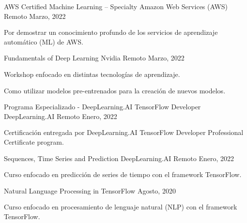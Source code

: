 

\begin{cventries}
  \cventry
  {AWS Certified Machine Learning – Specialty} %
  {Amazon Web Services (AWS)} %
  {Remoto} %
  {Marzo, 2022} %
  {
    \begin{cvitems} %
      \item {Por demostrar un conocimiento profundo de los servicios de aprendizaje automático (ML) de AWS.}
    \end{cvitems}
  } %
  \cventry
  {Fundamentals of Deep Learning} %
  {Nvidia} %
  {Remoto} %
  {Marzo, 2022} %
  {
    \begin{cvitems} %
      \item {Workshop enfocado en distintas tecnologías de aprendizaje.}
      \item {Como utilizar modelos pre-entrenados para la creación de nuevos modelos.}
    \end{cvitems}
  } %
  \cventry
  {Programa Especializado - DeepLearning.AI TensorFlow Developer} %
  {DeepLearning.AI} %
  {Remoto} %
  {Enero, 2022} %
  {
    \begin{cvitems} %
      \item {Certificación entregada por DeepLearning.AI TensorFlow Developer Professional Certificate program.}
    \end{cvitems}
  }
  \cventry
  {Sequences, Time Series and Prediction} %
  {DeepLearning.AI} %
  {Remoto} %
  {Enero, 2022} %
  {
    \begin{cvitems} %
      \item {Curso enfocado en predicción de series de tiempo con el framework TensorFlow.}
    \end{cvitems}
  }
  \cventry
  {Natural Language Processing in TensorFlow} %
  {} %
  {} %
  {Agosto, 2020} %
  {
    \begin{cvitems} %
      \item {Curso enfocado en procesamiento de lenguaje natural (NLP) con el framework TensorFlow.}
    \end{cvitems}
  }


\end{cventries}

